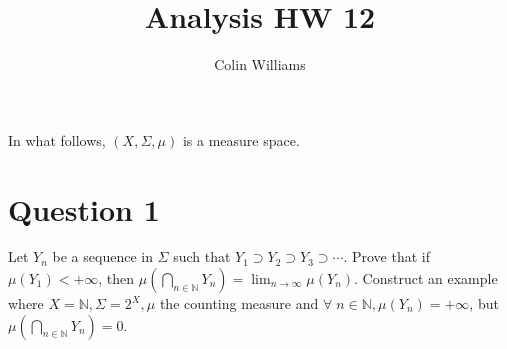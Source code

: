 \documentclass[10pt,a4paper]{article}
\title{Analysis HW 12}
\author{Colin Williams}
\theoremstyle{definition}
\theoremstyle{definition}
\numberwithin{equation}{section}
\begin{document}
\maketitle

In what follows, $(X, \Sigma, \mu)$ is a measure space. 

\section*{Question 1}
Let $Y_n$ be a sequence in $\Sigma$ such that $Y_1 \supset Y_2 \supset Y_3 \supset \cdots $. Prove that if $\mu(Y_1) < +\infty$, then $\mu\left(\bigcap_{n \in \mathbb{N}} Y_n\right) = \lim_{n \to \infty} \mu(Y_n)$. Construct an example where $X = \mathbb{N}, \Sigma = 2^X, \mu$ the counting measure and $\forall \; n \in \mathbb{N}, \mu(Y_n) = +\infty$, but $\mu\left(\bigcap_{n \in \mathbb{N}} Y_n \right) = 0$. 
\end{document}
